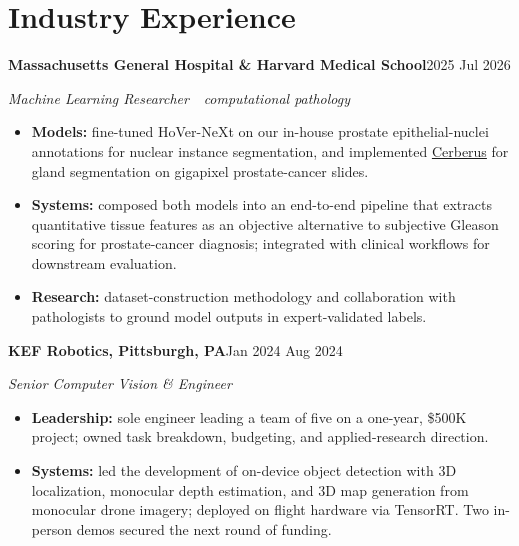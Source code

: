 \documentclass[10pt,letterpaper]{article}
\newcommand{\sansfam}{\sffamily}
\newcommand{\bdash}{\,\textemdash\,}
\newcommand{\datestamp}[1]{{\sansfam\footnotesize\color{meta}\figureversion{lf}#1}}
\newcommand{\role}[2]{%
  \filbreak%
  \par\vspace{1pt}%
  \noindent\textbf{#1}\hfill\datestamp{#2}\par\nopagebreak}
\newcommand{\sub}[1]{\noindent\textit{\footnotesize\color{meta} #1}\par\nopagebreak}
\newcommand{\acro}[1]{\textls[80]{#1}}
\begin{document}
\section{Industry Experience}

\role{Massachusetts General Hospital \& Harvard Medical School}{2025 \textendash{} Jul 2026}
\sub{Machine Learning Researcher \bdash{} computational pathology}
\begin{itemize}
  \item \textbf{Models:} fine-tuned HoVer-NeXt on our in-house prostate epithelial-nuclei annotations for nuclear instance segmentation, and implemented \href{https://github.com/TissueImageAnalytics/cerberus}{Cerberus} for gland segmentation on gigapixel prostate-cancer slides.
  \item \textbf{Systems:} composed both models into an end-to-end pipeline that extracts quantitative tissue features as an objective alternative to subjective Gleason scoring for prostate-cancer diagnosis; integrated with clinical workflows for downstream evaluation.
  \item \textbf{Research:} dataset-construction methodology and collaboration with pathologists to ground model outputs in expert-validated labels.
\end{itemize}

\role{KEF Robotics, Pittsburgh, PA}{Jan 2024 \textendash{} Aug 2024}
\sub{Senior Computer Vision \& \acro{ML} Engineer}
\begin{itemize}
  \item \textbf{Leadership:} sole \acro{ML} engineer leading a team of five on a one-year, \$500K project; owned task breakdown, budgeting, and applied-research direction.
  \item \textbf{Systems:} led the development of on-device object detection with 3D localization, monocular depth estimation, and 3D map generation from monocular drone imagery; deployed on flight hardware via TensorRT. Two in-person demos secured the next round of funding.
\end{itemize}
\end{document}
